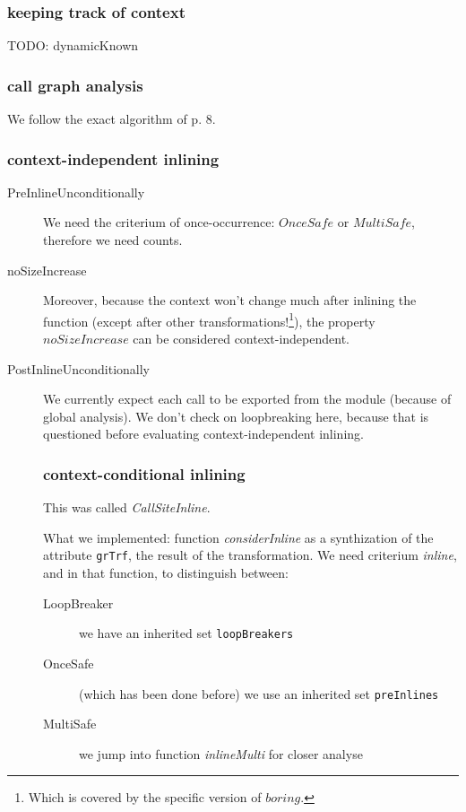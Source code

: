 \documentclass{article}
\begin{document}
\subsubsection{keeping track of context}
TODO: dynamicKnown

\subsubsection{call graph analysis}
We follow the exact algorithm of p. 8.

\subsubsection{context-independent inlining}
\begin{description}
\item[PreInlineUnconditionally] We need the criterium of once-occurrence: $OnceSafe$ or $MultiSafe$, therefore we need counts.
\item[noSizeIncrease] Moreover, because the \grin context won't change much after inlining the function (except after other transformations!\footnote{Which is covered by the \grin specific version of $boring$.}), the property $noSizeIncrease$ can be considered context-independent.

\item[PostInlineUnconditionally] We currently expect each call to be exported from the module (because of global analysis). We don't check on loopbreaking here, because that is questioned before evaluating context-independent inlining.

\subsubsection{context-conditional inlining}
This was called \emph{CallSiteInline}.

What we implemented: function \emph{considerInline} as a synthization of the attribute \texttt{grTrf}, the result of the transformation. We need criterium \emph{inline}, and in that function, to distinguish between:
\begin{description}
\item[LoopBreaker] we have an inherited set \texttt{loopBreakers}
\item[OnceSafe] (which has been done before) we use an inherited set \texttt{preInlines}
\item[MultiSafe] we jump into function \emph{inlineMulti} for closer analyse 
\end{description}


\end{description}
\end{document}
